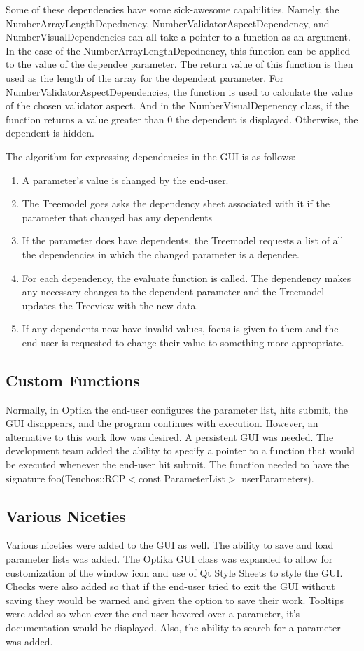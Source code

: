 	Some of these dependencies have some sick-awesome capabilities. Namely, the NumberArrayLengthDepednency, NumberValidatorAspectDependency, and NumberVisualDependencies
	can all take a pointer to a function as an argument. In the case of the NumberArrayLengthDepednency, this function can be applied to the value of the dependee
	parameter. The return value of this function is then used as the length of the array for the dependent parameter. For NumberValidatorAspectDependencies, the function
	is used to calculate the value of the chosen validator aspect. And in the NumberVisualDepenency class, if the function returns a value greater than 0 the dependent is
	displayed. Otherwise, the dependent is hidden. 

	The algorithm for expressing dependencies in the GUI is as follows:
	\begin{enumerate}
		\item A parameter's value is changed by the end-user.
		\item The Treemodel goes asks the dependency sheet associated with it if the parameter that changed has any dependents
		\item If the parameter does have dependents, the Treemodel requests a list of all the dependencies in which the changed
		parameter is a dependee.
		\item For each dependency, the evaluate function is called. The dependency makes any necessary changes to the dependent parameter
		and the Treemodel updates the Treeview with the new data.
		\item If any dependents now have invalid values, focus is given to them and the end-user is requested to change their value to
		something more appropriate.
	\end{enumerate}

	\subsection{Custom Functions}
	Normally, in Optika the end-user configures the parameter list, hits submit, the GUI disappears, and the program continues with execution. However,
	an alternative to this work flow was desired. A persistent GUI was needed. The development team added the ability to specify a pointer to a function
	that would be executed whenever the end-user hit submit. The function needed to have the signature foo(Teuchos::RCP$<$const ParameterList$>$ userParameters).

	\subsection{Various Niceties}
	Various niceties were added to the GUI as well. The ability to save and load parameter lists was added. The Optika GUI class was expanded to allow for
	customization of the window icon and use of Qt Style Sheets to style the GUI. Checks were also added so that if the end-user tried to exit the GUI without
	saving they would be warned and given the option to save their work. Tooltips were added so when ever the end-user hovered over a parameter, it's documentation
	would be displayed. Also, the ability to search for a parameter was added.

